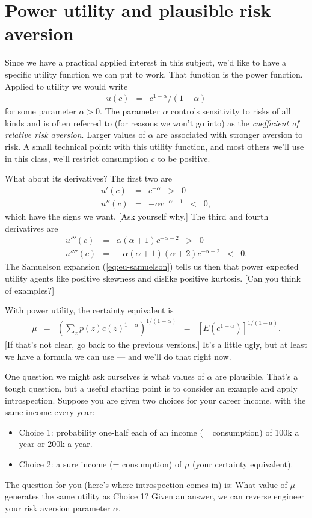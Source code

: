 \documentclass[11pt]{article}
\begin{document}
\section{Power utility and plausible risk aversion}

Since we have a practical applied interest in this subject,
we'd like to have a specific utility function we can put to work.
That function is the power function.
Applied to utility we would write
\begin{eqnarray*}
    u(c) &=& c^{1-\alpha}/(1-\alpha)
\end{eqnarray*}
for some parameter $\alpha > 0$.
The parameter $\alpha$ controls sensitivity to risks of all kinds
and is often referred to (for reasons we won't go into)
as the {\it coefficient of relative risk aversion\/}.
Larger values of $\alpha$ are associated with stronger aversion to risk.
A small technical point:  with this utility function,
and most others we'll use in this class,
we'll restrict consumption $c$ to be positive.

What about its derivatives?
The first two are
\begin{eqnarray*}
    u'(c)  &=& c^{-\alpha} \;\;>\;\; 0 \\
    u''(c) &=& -\alpha c^{-\alpha-1} \;\;<\;\; 0 ,
\end{eqnarray*}
which have the signs we want.
[Ask yourself why.]
The third and fourth derivatives are
\begin{eqnarray*}
    u'''(c)  &=& \alpha (\alpha+1) c^{-\alpha-2} \;\;>\;\; 0 \\
    u''''(c) &=& - \alpha (\alpha+1) (\alpha+2) c^{-\alpha-2} \;\;<\;\; 0 .
\end{eqnarray*}
The Samuelson expansion (\ref{eq:eu-samuelson}) tells us then that
power expected utility agents like positive skewness
and dislike positive kurtosis.
[Can you think of examples?]

With power utility,
the certainty equivalent is
\begin{eqnarray}
    \mu &=& \left( \sum_z p(z) c(z)^{1-\alpha} \right)^{1/(1-\alpha)}
        \;\;=\;\; \left[ E (c^{1-\alpha}) \right]^{1/(1-\alpha)} .
    \label{eq:certainty-equivalent-power}
\end{eqnarray}
[If that's not clear, go back to the previous versions.]
It's a little ugly, but at least we have a formula we can use ---
and we'll do that right now.


One question we might ask ourselves is what values of $\alpha$ are plausible.
That's a tough question,
but a useful starting point is to consider an example and apply introspection.
Suppose you are given two choices for your career income, with the same
income every year:
\begin{itemize}
\item Choice 1:  probability one-half each of an income (= consumption)
of 100k a year or 200k a year.
\item Choice 2:  a sure income (= consumption) of $\mu$ (your certainty equivalent).
\end{itemize}
The question for you (here's where introspection comes in) is:
What value of $\mu$ generates the same utility as Choice 1?
Given an answer, we can reverse engineer your risk aversion
parameter $\alpha$.
\end{document}
